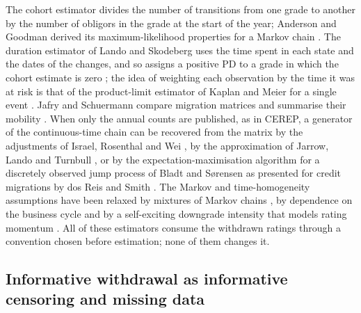 The cohort estimator divides the number of transitions from one grade to another by the number of obligors in the grade at the start of the year; Anderson and Goodman derived its maximum-likelihood properties for a Markov chain \citep{Anderson_1957}. The duration estimator of Lando and Skodeberg uses the time spent in each state and the dates of the changes, and so assigns a positive PD to a grade in which the cohort estimate is zero \citep{Lando_2002,Schuermann_2004}; the idea of weighting each observation by the time it was at risk is that of the product-limit estimator of Kaplan and Meier for a single event \citep{Kaplan_1958}. Jafry and Schuermann compare migration matrices and summarise their mobility \citep{Jafry_2004}. When only the annual counts are published, as in CEREP, a generator of the continuous-time chain can be recovered from the matrix by the adjustments of Israel, Rosenthal and Wei \citep{Israel_2001}, by the approximation of Jarrow, Lando and Turnbull \citep{Jarrow_1997}, or by the expectation-maximisation algorithm for a discretely observed jump process of Bladt and S\o rensen \citep{Bladt_2005} as presented for credit migrations by dos Reis and Smith \citep{dosReis_2018}. The Markov and time-homogeneity assumptions have been relaxed by mixtures of Markov chains \citep{Frydman_2008}, by dependence on the business cycle \citep{Bangia_2002} and by a self-exciting downgrade intensity that models rating momentum \citep{dosReis_2020}. All of these estimators consume the withdrawn ratings through a convention chosen before estimation; none of them changes it. %

\subsection{Informative withdrawal as informative censoring and missing data}
\label{sec:rw-censoring}


